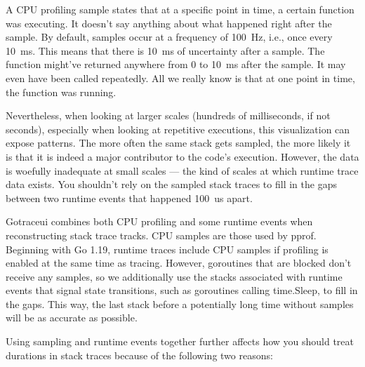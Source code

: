 \documentclass[10pt,letterpaper,oneside,openany,showtrims,draft]{memoir}
\newcommand{\code}[1]{{\ttfamily\mbox{#1}}}
\begin{document}
A CPU profiling sample states that at a specific point in time, a certain function was executing.
It doesn't say anything about what happened right after the sample.
By default, samples occur at a frequency of \unit{100 Hz}, i.e., once every \unit{10 ms}.
This means that there is \unit{10 ms} of uncertainty after a sample.
The function might've returned anywhere from \unit{0} to \unit{10 ms} after the sample.
It may even have been called repeatedly.
All we really know is that at one point in time, the function was running.

Nevertheless, when looking at larger scales (hundreds of milliseconds, if not seconds),
especially when looking at repetitive executions,
this visualization can expose patterns.
The more often the same stack gets sampled, the more likely it is that it is indeed a major contributor to the code's execution.
However, the data is woefully inadequate at small scales --- the kind of scales at which runtime trace data exists.
You shouldn't rely on the sampled stack traces to fill in the gaps between two runtime events that happened \unit{100 us} apart.

Gotraceui combines both CPU profiling and some runtime events when reconstructing stack trace tracks.
CPU samples are those used by pprof.
Beginning with Go 1.19, runtime traces include CPU samples if profiling is enabled at the same time as tracing.
However, goroutines that are blocked don't receive any samples, so we additionally use
the stacks associated with runtime events that signal state transitions, such as goroutines calling \code{time.Sleep},
to fill in the gaps.
This way, the last stack before a potentially long time without samples will be as accurate as possible.

Using sampling and runtime events together further affects how you should treat durations in stack traces
because of the following two reasons:
\end{document}

